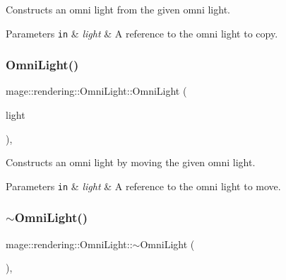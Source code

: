 Constructs an omni light from the given omni light.


\begin{DoxyParams}[1]{Parameters}
\mbox{\tt in}  & {\em light} & A reference to the omni light to copy. \\
\hline
\end{DoxyParams}
\mbox{\label{classmage_1_1rendering_1_1_omni_light_a235afcf044e62a3f6672316eb8f3cd99}} 
\subsubsection{\texorpdfstring{Omni\+Light()}{OmniLight()}\hspace{0.1cm}{\footnotesize\ttfamily [3/3]}}
{\footnotesize\ttfamily mage\+::rendering\+::\+Omni\+Light\+::\+Omni\+Light (\begin{DoxyParamCaption}\item[{\mbox{\hyperlink{classmage_1_1rendering_1_1_omni_light}{Omni\+Light}} \&\&}]{light }\end{DoxyParamCaption})\hspace{0.3cm}{\ttfamily [default]}, {\ttfamily [noexcept]}}

Constructs an omni light by moving the given omni light.


\begin{DoxyParams}[1]{Parameters}
\mbox{\tt in}  & {\em light} & A reference to the omni light to move. \\
\hline
\end{DoxyParams}
\mbox{\label{classmage_1_1rendering_1_1_omni_light_af0981e056620d3f0df827098448c8052}} 
\subsubsection{\texorpdfstring{$\sim$\+Omni\+Light()}{~OmniLight()}}
{\footnotesize\ttfamily mage\+::rendering\+::\+Omni\+Light\+::$\sim$\+Omni\+Light (\begin{DoxyParamCaption}{ }\end{DoxyParamCaption})\hspace{0.3cm}{\ttfamily [virtual]}, {\ttfamily [default]}}

